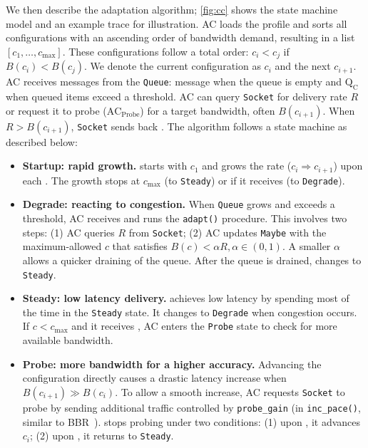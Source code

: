 We then describe the adaptation algorithm; \autoref{fig:cc} shows the state
machine model and an example trace for illustration.  AC loads the profile and
sorts all configurations with an ascending order of bandwidth demand, resulting
in a list $[c_1, \dots, c_{\max}]$.  These configurations follow a total order:
$c_i < c_j$ if $B(c_i) < B(c_j)$.  We denote the current configuration as $c_i$
and the next $c_{i+1}$.  AC receives messages from the \texttt{Queue}: message
\qe{} when the queue is empty and $\text{Q}_\text{C}$ when queued items exceed a
threshold. AC can query \texttt{Socket} for delivery rate $R$ or request it to
probe ($\text{AC}_{\text{Probe}}$) for a target bandwidth, often
$B(c_{i+1})$. When $R > B(c_{i+1})$, \texttt{Socket} sends back \spd{}. The
algorithm follows a state machine as described below:

\begin{itemize}[leftmargin=*, topsep=3pt, itemsep=0pt]

\item \textbf{Startup: rapid growth.} \sysname{} starts with $c_1$ and grows the
  rate ($c_i \Rightarrow c_{i+1}$) upon each \qe{}. The growth stops at
  $c_{\max}$ (to \texttt{Steady}) or if it receives \qc{} (to \texttt{Degrade}).

\item \textbf{Degrade: reacting to congestion.} When \texttt{Queue} grows and
  exceeds a threshold, AC receives \qc{} and runs the \texttt{adapt()}
  procedure. This involves two steps: (1) AC queries $R$ from \texttt{Socket};
  (2) AC updates \texttt{Maybe} with the maximum-allowed $c$ that satisfies
  $B(c) < \alpha R, \alpha \in (0, 1)$. A smaller $\alpha$ allows a quicker
  draining of the queue. After the queue is drained, \sysname{} changes to
  \texttt{Steady}.

\item \textbf{Steady: low latency delivery.} \sysname{} achieves low latency by
  spending most of the time in the \texttt{Steady} state. It changes to
  \texttt{Degrade} when congestion occurs. If $c < c_{\max}$ and it receives
  \qe{}, AC enters the \texttt{Probe} state to check for more available
  bandwidth.

\item \textbf{Probe: more bandwidth for a higher accuracy.} Advancing the configuration
  directly causes a drastic latency increase when $B(c_{i+1}) \gg B(c_i)$. To
  allow a smooth increase, AC requests \texttt{Socket} to probe by sending
  additional traffic controlled by \texttt{probe\_gain} (in
  \texttt{inc\_pace()}, similar to BBR~\cite{cardwell2017bbr}). \sysname{} stops
  probing under two conditions: (1) upon \spd{}, it advances $c_i$; (2) upon
  \qc{}, it returns to \texttt{Steady}.

\end{itemize}

